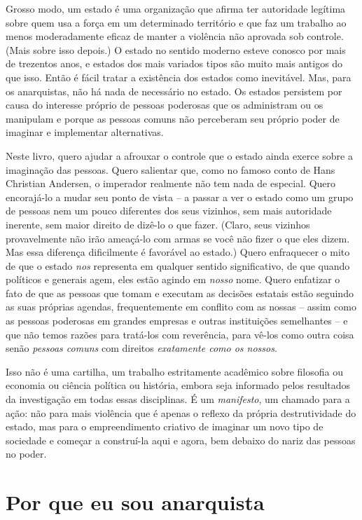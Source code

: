 Grosso modo, um estado é uma organização que afirma ter autoridade legítima sobre quem usa a força em um determinado território e que faz um trabalho ao menos moderadamente eficaz de manter a violência não aprovada sob controle. (Mais sobre isso depois.) O estado no sentido moderno esteve conosco por mais de trezentos anos, e estados dos mais variados tipos são muito mais antigos do que isso. Então é fácil tratar a existência dos estados como inevitável. Mas, para os anarquistas, não há nada de necessário no estado. Os estados persistem por causa do interesse próprio de pessoas poderosas que os administram ou os manipulam e porque as pessoas comuns não perceberam seu próprio poder de imaginar e implementar alternativas.

Neste livro, quero ajudar a afrouxar o controle que o estado ainda exerce sobre a imaginação das pessoas. Quero salientar que, como no famoso conto de Hans Christian Andersen, o imperador realmente não tem nada de especial. Quero encorajá-lo a mudar seu ponto de vista -- a passar a ver o estado como um grupo de pessoas nem um pouco diferentes dos seus vizinhos, sem mais autoridade inerente, sem maior direito de dizê-lo o que fazer. (Claro, seus vizinhos provavelmente não irão ameaçá-lo com armas se você não fizer o que eles dizem. Mas essa diferença dificilmente é favorável ao estado.) Quero enfraquecer o mito de que o estado \emph{nos} representa em qualquer sentido significativo, de que quando políticos e generais agem, eles estão agindo em \emph{nosso} nome. Quero enfatizar o fato de que as pessoas que tomam e executam as decisões estatais estão seguindo as suas próprias agendas, frequentemente em conflito com as nossas -- assim como as pessoas poderosas em grandes empresas e outras instituições semelhantes -- e que não temos razões para tratá-los com reverência, para vê-los como outra coisa senão \emph{pessoas comuns} com direitos \emph{exatamente como os nossos}.

Isso não é uma cartilha, um trabalho estritamente acadêmico sobre filosofia ou economia ou ciência política ou história, embora seja informado pelos resultados da investigação em todas essas disciplinas. É um \emph{manifesto}, um chamado para a ação: não para mais violência que é apenas o reflexo da própria destrutividade do estado, mas para o empreendimento criativo de imaginar um novo tipo de sociedade e começar a construí-la aqui e agora, bem debaixo do nariz das pessoas no poder.

\section{Por que eu sou anarquista}

